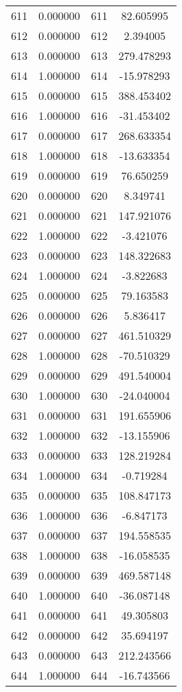 \documentclass[12pt]{article}
\begin{document}
\begin{longtable}{@{}cccc@{}}
611 & 0.000000 & 611 & 82.605995 \\
612 & 0.000000 & 612 & 2.394005 \\
613 & 0.000000 & 613 & 279.478293 \\
614 & 1.000000 & 614 & -15.978293 \\
615 & 0.000000 & 615 & 388.453402 \\
616 & 1.000000 & 616 & -31.453402 \\
617 & 0.000000 & 617 & 268.633354 \\
618 & 1.000000 & 618 & -13.633354 \\
619 & 0.000000 & 619 & 76.650259 \\
620 & 0.000000 & 620 & 8.349741 \\
621 & 0.000000 & 621 & 147.921076 \\
622 & 1.000000 & 622 & -3.421076 \\
623 & 0.000000 & 623 & 148.322683 \\
624 & 1.000000 & 624 & -3.822683 \\
625 & 0.000000 & 625 & 79.163583 \\
626 & 0.000000 & 626 & 5.836417 \\
627 & 0.000000 & 627 & 461.510329 \\
628 & 1.000000 & 628 & -70.510329 \\
629 & 0.000000 & 629 & 491.540004 \\
630 & 1.000000 & 630 & -24.040004 \\
631 & 0.000000 & 631 & 191.655906 \\
632 & 1.000000 & 632 & -13.155906 \\
633 & 0.000000 & 633 & 128.219284 \\
634 & 1.000000 & 634 & -0.719284 \\
635 & 0.000000 & 635 & 108.847173 \\
636 & 1.000000 & 636 & -6.847173 \\
637 & 0.000000 & 637 & 194.558535 \\
638 & 1.000000 & 638 & -16.058535 \\
639 & 0.000000 & 639 & 469.587148 \\
640 & 1.000000 & 640 & -36.087148 \\
641 & 0.000000 & 641 & 49.305803 \\
642 & 0.000000 & 642 & 35.694197 \\
643 & 0.000000 & 643 & 212.243566 \\
644 & 1.000000 & 644 & -16.743566 \\

\end{longtable}
\end{document}

